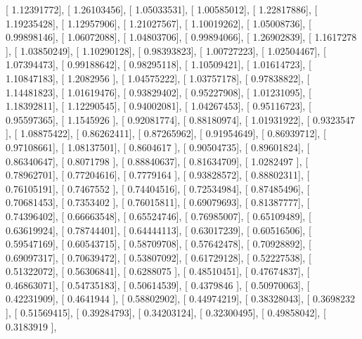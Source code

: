 \documentclass{article}
\begin{document}
       [ 1.12391772],
       [ 1.26103456],
       [ 1.05033531],
       [ 1.00585012],
       [ 1.22817886],
       [ 1.19235428],
       [ 1.12957906],
       [ 1.21027567],
       [ 1.10019262],
       [ 1.05008736],
       [ 0.99898146],
       [ 1.06072088],
       [ 1.04803706],
       [ 0.99894066],
       [ 1.26902839],
       [ 1.1617278 ],
       [ 1.03850249],
       [ 1.10290128],
       [ 0.98393823],
       [ 1.00727223],
       [ 1.02504467],
       [ 1.07394473],
       [ 0.99188642],
       [ 0.98295118],
       [ 1.10509421],
       [ 1.01614723],
       [ 1.10847183],
       [ 1.2082956 ],
       [ 1.04575222],
       [ 1.03757178],
       [ 0.97838822],
       [ 1.14481823],
       [ 1.01619476],
       [ 0.93829402],
       [ 0.95227908],
       [ 1.01231095],
       [ 1.18392811],
       [ 1.12290545],
       [ 0.94002081],
       [ 1.04267453],
       [ 0.95116723],
       [ 0.95597365],
       [ 1.1545926 ],
       [ 0.92081774],
       [ 0.88180974],
       [ 1.01931922],
       [ 0.9323547 ],
       [ 1.08875422],
       [ 0.86262411],
       [ 0.87265962],
       [ 0.91954649],
       [ 0.86939712],
       [ 0.97108661],
       [ 1.08137501],
       [ 0.8604617 ],
       [ 0.90504735],
       [ 0.89601824],
       [ 0.86340647],
       [ 0.8071798 ],
       [ 0.88840637],
       [ 0.81634709],
       [ 1.0282497 ],
       [ 0.78962701],
       [ 0.77204616],
       [ 0.7779164 ],
       [ 0.93828572],
       [ 0.88802311],
       [ 0.76105191],
       [ 0.7467552 ],
       [ 0.74404516],
       [ 0.72534984],
       [ 0.87485496],
       [ 0.70681453],
       [ 0.7353402 ],
       [ 0.76015811],
       [ 0.69079693],
       [ 0.81387777],
       [ 0.74396402],
       [ 0.66663548],
       [ 0.65524746],
       [ 0.76985007],
       [ 0.65109489],
       [ 0.63619924],
       [ 0.78744401],
       [ 0.64444113],
       [ 0.63017239],
       [ 0.60516506],
       [ 0.59547169],
       [ 0.60543715],
       [ 0.58709708],
       [ 0.57642478],
       [ 0.70928892],
       [ 0.69097317],
       [ 0.70639472],
       [ 0.53807092],
       [ 0.61729128],
       [ 0.52227538],
       [ 0.51322072],
       [ 0.56306841],
       [ 0.6288075 ],
       [ 0.48510451],
       [ 0.47674837],
       [ 0.46863071],
       [ 0.54735183],
       [ 0.50614539],
       [ 0.4379846 ],
       [ 0.50970063],
       [ 0.42231909],
       [ 0.4641944 ],
       [ 0.58802902],
       [ 0.44974219],
       [ 0.38328043],
       [ 0.3698232 ],
       [ 0.51569415],
       [ 0.39284793],
       [ 0.34203124],
       [ 0.32300495],
       [ 0.49858042],
       [ 0.3183919 ],
\end{document}
